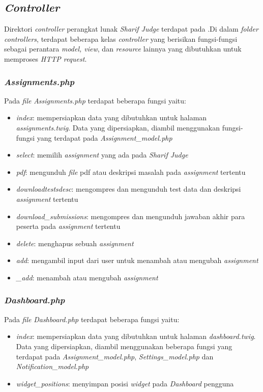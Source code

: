 \subsection{\textit{Controller}}
Direktori \textit{controller} perangkat lunak \textit{Sharif Judge} terdapat pada .Di dalam \textit{folder controllers}, terdapat beberapa kelas \textit{controller} yang berisikan fungsi-fungsi sebagai perantara \textit{model, view}, dan \textit{resource} lainnya yang dibutuhkan untuk memproses \textit{HTTP request}.

\subsubsection{\textit{Assignments.php}}
Pada \textit{file} \textit{Assignments.php} terdapat beberapa fungsi yaitu:
\begin{itemize}
	\item \textit{index}: mempersiapkan data yang dibutuhkan untuk halaman \textit{assignments.twig}. Data yang dipersiapkan, diambil menggunakan fungsi-fungsi yang terdapat pada \textit{Assignment\_model.php}
	\item \textit{select}: memilih \textit{assignment} yang ada pada \textit{Sharif Judge}
	\item \textit{pdf}: mengunduh \textit{file} pdf atau deskripsi masalah pada \textit{assignment} tertentu
	\item \textit{downloadtestsdesc}: mengompres dan mengunduh test data dan deskripsi \textit{assignment} tertentu
	\item \textit{download\_submissions}: mengompres dan mengunduh jawaban akhir para peserta pada \textit{assignment} tertentu
	\item \textit{delete}: menghapus sebuah \textit{assignment}
	\item \textit{add}: mengambil input dari user untuk menambah atau mengubah \textit{assignment}
	\item \textit{\_add}: menambah atau mengubah \textit{assignment}
\end{itemize}

\subsubsection{\textit{Dashboard.php}}
Pada \textit{file} \textit{Dashboard.php} terdapat beberapa fungsi yaitu:
\begin{itemize}
	\item \textit{index}: mempersiapkan data yang dibutuhkan untuk halaman \textit{dashboard.twig}. Data yang dipersiapkan, diambil menggunakan beberapa fungsi yang terdapat pada \textit{Assignment\_model.php}, \textit{Settings\_model.php} dan \textit{Notification\_model.php}
	\item \textit{widget\_positions}: menyimpan posisi \textit{widget} pada \textit{Dashboard} pengguna
\end{itemize}

